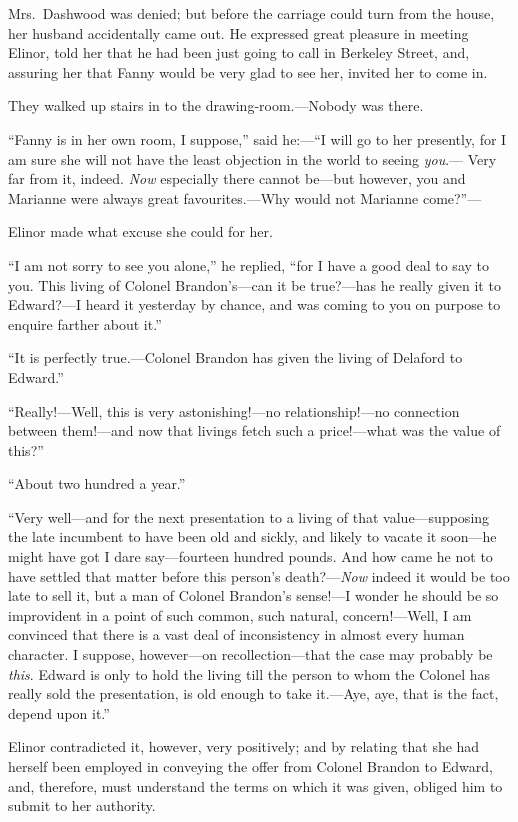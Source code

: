 Mrs.\ Dashwood was denied; but before the carriage could
turn from the house, her husband accidentally came out.
He expressed great pleasure in meeting Elinor, told her
that he had been just going to call in Berkeley Street,
and, assuring her that Fanny would be very glad to see her,
invited her to come in.

They walked up stairs in to the drawing-room.---Nobody was there.

``Fanny is in her own room, I suppose,'' said he:---``I
will go to her presently, for I am sure she will not
have the least objection in the world to seeing \emph{you}.---%
Very far from it, indeed.  \emph{Now} especially there
cannot be---but however, you and Marianne were always
great favourites.---Why would not Marianne come?''---%

Elinor made what excuse she could for her.

``I am not sorry to see you alone,'' he replied,
``for I have a good deal to say to you.  This living
of Colonel Brandon's---can it be true?---has he really given
it to Edward?---I heard it yesterday by chance, and was
coming to you on purpose to enquire farther about it.''

``It is perfectly true.---Colonel Brandon has given
the living of Delaford to Edward.''

``Really!---Well, this is very astonishing!---no
relationship!---no connection between them!---and now
that livings fetch such a price!---what was the value of this?''

``About two hundred a year.''

``Very well---and for the next presentation to a living
of that value---supposing the late incumbent to have
been old and sickly, and likely to vacate it soon---he
might have got I dare say---fourteen hundred pounds.
And how came he not to have settled that matter before this
person's death?---\emph{Now} indeed it would be too late to sell it,
but a man of Colonel Brandon's sense!---I wonder he should
be so improvident in a point of such common, such natural,
concern!---Well, I am convinced that there is a vast deal
of inconsistency in almost every human character.  I suppose,
however---on recollection---that the case may probably be \emph{this}.
Edward is only to hold the living till the person to whom
the Colonel has really sold the presentation, is old enough
to take it.---Aye, aye, that is the fact, depend upon it.''

Elinor contradicted it, however, very positively;
and by relating that she had herself been employed
in conveying the offer from Colonel Brandon to Edward,
and, therefore, must understand the terms on which it
was given, obliged him to submit to her authority.

